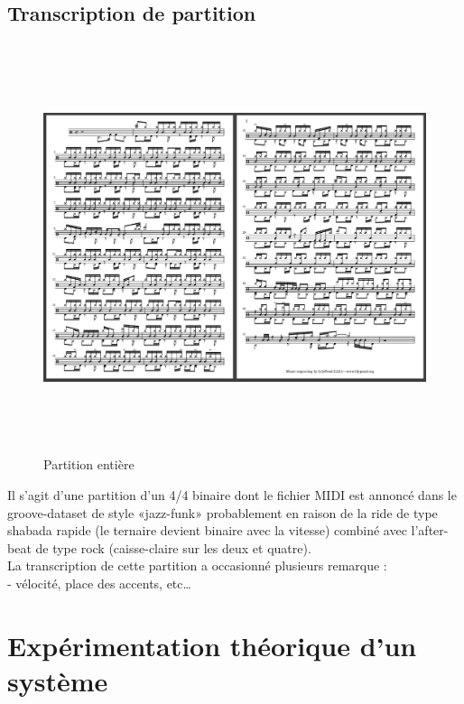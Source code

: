 \subsection*{Transcription de partition}
\begin{figure}[h]
	\includegraphics[height=120mm, width=160mm]{z_images/4_experimentations/1_analyse_midi_audio/3_partition.png}
	\caption{Partition entière}
	\label{partition_entiere}
\end{figure}
Il s’agit d’une partition d’un 4/4 binaire dont le fichier MIDI est annoncé dans le groove-dataset de style «jazz-funk» probablement en raison de la ride de type shabada rapide (le ternaire devient binaire avec la vitesse) combiné avec l’after-beat de type rock (caisse-claire sur les deux et quatre).\\
La transcription de cette partition a occasionné plusieurs remarque :\\
- vélocité, place des accents, etc…
\section{Expérimentation théorique d’un système}
